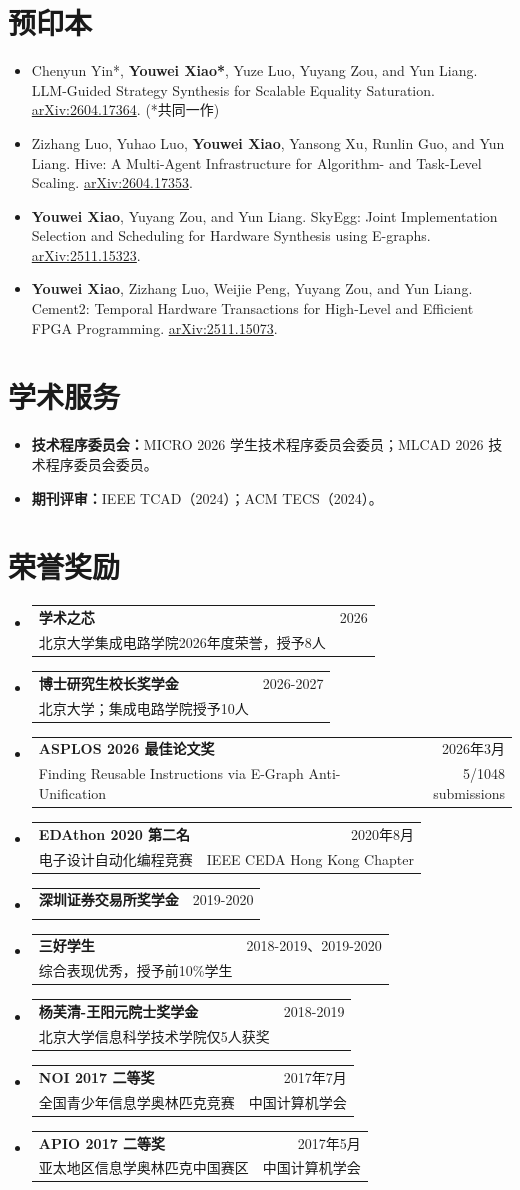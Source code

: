 \documentclass[letterpaper,11pt]{article}
\makeatletter
\newcommand{\CVItem}[1]{\item\small #1 \vspace{-2pt}}
\newcommand{\CVSubheading}[4]{
  \vspace{-2pt}\item
    \begin{tabular*}{0.97\textwidth}[t]{l@{\extracolsep{\fill}}r}
      \textbf{#1} & #2 \\
      \small#3 & \small #4 \\
    \end{tabular*}\vspace{-7pt}
}
\newcommand{\ArxivLink}[1]{\href{https://arxiv.org/abs/#1}{arXiv:#1}}
\newcommand{\CVSubHeadingListStart}{\begin{itemize}[leftmargin=0.5cm, label={}]}
\newcommand{\CVSubHeadingListEnd}{\end{itemize}}
\newcommand{\CVItemListStart}{\begin{itemize}[leftmargin=0.55cm]}
\newcommand{\CVItemListEnd}{\end{itemize}\vspace{-5pt}}
\makeatother
\begin{document}
\section{预印本}
\CVItemListStart
\CVItem{Chenyun Yin*, \textbf{Youwei Xiao*}, Yuze Luo, Yuyang Zou, and Yun Liang. LLM-Guided Strategy Synthesis for Scalable Equality Saturation. \ArxivLink{2604.17364}. (*共同一作)}
\CVItem{Zizhang Luo, Yuhao Luo, \textbf{Youwei Xiao}, Yansong Xu, Runlin Guo, and Yun Liang. Hive: A Multi-Agent Infrastructure for Algorithm- and Task-Level Scaling. \ArxivLink{2604.17353}.}
\CVItem{\textbf{Youwei Xiao}, Yuyang Zou, and Yun Liang. SkyEgg: Joint Implementation Selection and Scheduling for Hardware Synthesis using E-graphs. \ArxivLink{2511.15323}.}
\CVItem{\textbf{Youwei Xiao}, Zizhang Luo, Weijie Peng, Yuyang Zou, and Yun Liang. Cement2: Temporal Hardware Transactions for High-Level and Efficient FPGA Programming. \ArxivLink{2511.15073}.}
\CVItemListEnd

\section{学术服务}
\CVItemListStart
\CVItem{\textbf{技术程序委员会：}MICRO 2026 学生技术程序委员会委员；MLCAD 2026 技术程序委员会委员。}
\CVItem{\textbf{期刊评审：}IEEE TCAD（2024）；ACM TECS（2024）。}
\CVItemListEnd

\section{荣誉奖励}
  \CVSubHeadingListStart
    \CVSubheading
      {学术之芯}{2026}
      {北京大学集成电路学院2026年度荣誉，授予8人}{}
    \CVSubheading
      {博士研究生校长奖学金}{2026-2027}
      {北京大学；集成电路学院授予10人}{}
    \CVSubheading
      {ASPLOS 2026 最佳论文奖}{2026年3月}
      {Finding Reusable Instructions via E-Graph Anti-Unification}{5/1048 submissions}
    \CVSubheading
      {EDAthon 2020 第二名}{2020年8月}
      {电子设计自动化编程竞赛}{IEEE CEDA Hong Kong Chapter}
    \CVSubheading
      {深圳证券交易所奖学金}{2019-2020}
      {}{}
    \CVSubheading
      {三好学生}{2018-2019、2019-2020}
      {综合表现优秀，授予前10\%学生}{}
    \CVSubheading
      {杨芙清-王阳元院士奖学金}{2018-2019}
      {北京大学信息科学技术学院仅5人获奖}{}
    \CVSubheading
      {NOI 2017 二等奖}{2017年7月}
      {全国青少年信息学奥林匹克竞赛}{中国计算机学会}
    \CVSubheading
      {APIO 2017 二等奖}{2017年5月}
      {亚太地区信息学奥林匹克中国赛区}{中国计算机学会}
  \CVSubHeadingListEnd
\end{document}
